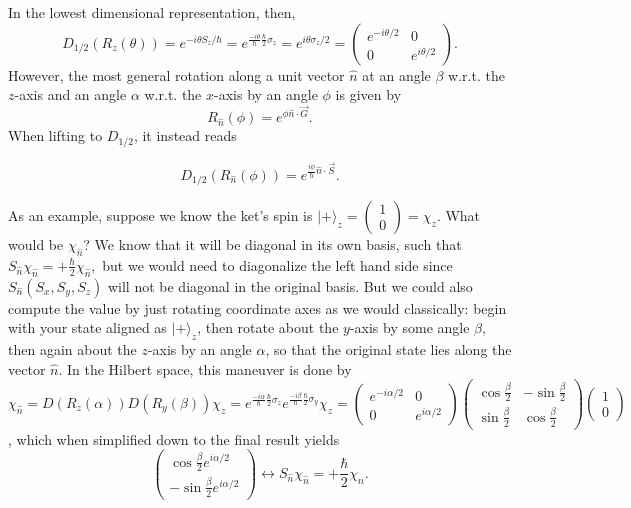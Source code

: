 \documentclass[fontsize=12pt]{scrartcl}
\newcommand{\ra}{\rangle}
\begin{document}
In the lowest dimensional representation, then, $$D_{1/2}(R_z(\theta))=e^{-i\theta S_z/\hbar}=e^{\frac{-i\theta}{\hbar}\frac{\hbar}{2}\sigma_z}=e^{i\theta\sigma_z/2}=\left(\begin{matrix}
e^{-i\theta/2}&0\\0&e^{i\theta/2}
\end{matrix}\right).$$ However, the most general rotation along a unit vector $\hat{n}$ at an angle $\beta$ w.r.t. the $z$-axis and an angle $\alpha$ w.r.t. the $x$-axis by an angle $\phi$ is given by $$R_{\hat{n}}(\phi)=e^{\phi\hat{n}\cdot\vec{G}}.$$ When lifting to $D_{1/2}$, it instead reads \begin{mdframed} $$ D_{1/2}(R_{\hat{n}}(\phi))=e^{\frac{i\phi}{\hbar}\hat{n}\cdot\vec{S}}.$$\end{mdframed}

As an example, suppose we know the ket's spin is $|+\ra_z=\left(\begin{smallmatrix}
1\\0
\end{smallmatrix}\right)=\chi_z$. What would be $\chi_{\hat{n}}$? We know that it will be diagonal in its own basis, such that $S_{\hat{n}}\chi_{\hat{n}}=+\frac{\hbar}{2}\chi_{\hat{n}},$ but we would need to diagonalize the left hand side since $S_{\hat{n}}(S_x, S_y, S_z)$ will not be diagonal in the original basis. But we could also compute the value by just rotating coordinate axes as we would classically: begin with your state aligned as $|+\ra_z$, then rotate about the $y$-axis by some angle $\beta$, then again about the $z$-axis by an angle $\alpha$, so that the original state lies along the vector $\hat{n}$. In the Hilbert space, this maneuver is done by $$\chi_{\hat{n}}=D(R_z(\alpha))D(R_y(\beta))\chi_z=e^{\frac{-i\alpha}{\hbar}\frac{\hbar}{2}\sigma_z}e^{\frac{-i\beta}{\hbar}\frac{\hbar}{2}\sigma_y}\chi_z=\left(\begin{matrix}
e^{-i\alpha/2}&0\\0&e^{i\alpha/2}
\end{matrix}\right)\left(\begin{matrix}
\cos\frac{\beta}{2} & -\sin\frac{\beta}{2}\\\sin\frac{\beta}{2}&\cos\frac{\beta}{2}
\end{matrix}\right)\left(\begin{matrix}
1\\0
\end{matrix}\right)$$, which when simplified down to the final result yields $$\left(\begin{matrix}
\cos\frac{\beta}{2} e^{i\alpha/2}\\-\sin\frac{\beta}{2}e^{i\alpha/2}
\end{matrix}\right) \leftrightarrow S_{\hat{n}}\chi_{\hat{n}}=+\frac{\hbar}{2}\chi_{\hat{n}}.$$
\end{document}
